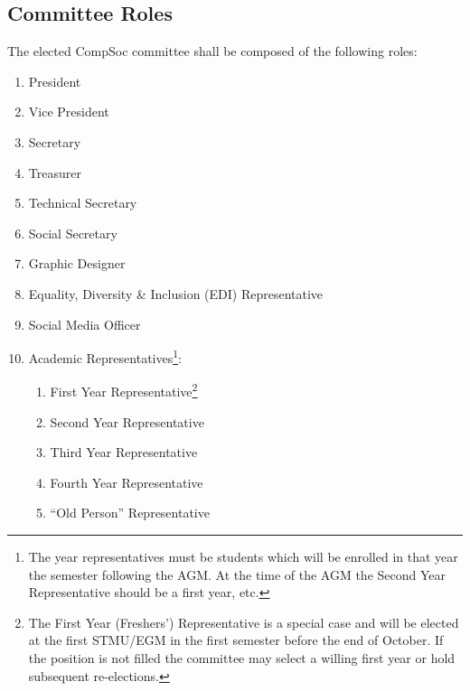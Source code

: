 \subsection{Committee Roles}
The elected CompSoc committee shall be composed of the following roles:
\begin{enumerate}
    \item President  
    \item Vice President
    \item Secretary
    \item Treasurer
    \item Technical Secretary
    \item Social Secretary
    \item Graphic Designer
    \item Equality, Diversity \& Inclusion (EDI) Representative
    \item Social Media Officer
    \item Academic Representatives\footnote{ The year representatives must be students which will be enrolled in that year the semester following the AGM\@. At the time of the AGM the Second Year Representative should be a first year, etc.}:
    \begin{enumerate}
        \item First Year Representative\footnote{ The First Year (Freshers') Representative is a special case and will be elected at the first STMU/EGM in the first semester before the end of October. If the position is not filled the committee may select a willing first year or hold subsequent re-elections.}
        \item Second Year Representative
        \item Third Year Representative 
        \item Fourth Year Representative
        \item ``Old Person'' Representative
    \end{enumerate}
\end{enumerate}

\newpage


